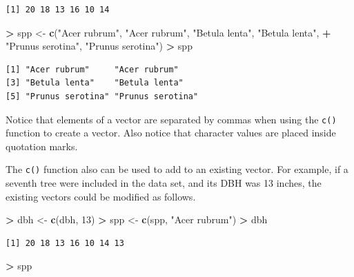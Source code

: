\documentclass[]{krantz}
\makeatletter
\newenvironment{Shaded}{\begin{snugshade}}{\end{snugshade}}
\newcommand{\KeywordTok}[1]{\textcolor[rgb]{0.27,0.27,0.27}{\textbf{#1}}}
\newcommand{\DecValTok}[1]{\textcolor[rgb]{0.06,0.06,0.06}{#1}}
\newcommand{\StringTok}[1]{\textcolor[rgb]{0.5,0.5,0.5}{#1}}
\newcommand{\OperatorTok}[1]{\textcolor[rgb]{0.43,0.43,0.43}{\textbf{#1}}}
\newcommand{\NormalTok}[1]{#1}
\newenvironment{kframe}{%
\medskip{}
\setlength{\fboxsep}{.8em}
 \def\at@end@of@kframe{}%
 \ifinner\ifhmode%
  \def\at@end@of@kframe{\end{minipage}}%
  \begin{minipage}{\columnwidth}%
 \fi\fi%
 \def\FrameCommand##1{\hskip\@totalleftmargin \hskip-\fboxsep
 \colorbox{shadecolor}{##1}\hskip-\fboxsep
     \hskip-\linewidth \hskip-\@totalleftmargin \hskip\columnwidth}%
 \MakeFramed {\advance\hsize-\width
   \@totalleftmargin\z@ \linewidth\hsize
   \@setminipage}}%
 {\par\unskip\endMakeFramed%
 \at@end@of@kframe}
\renewenvironment{Shaded}{\begin{kframe}}{\end{kframe}}
\theoremstyle{definition}
\theoremstyle{definition}
\theoremstyle{definition}
\theoremstyle{remark}
\makeatother
\begin{document}
\begin{verbatim}
[1] 20 18 13 16 10 14
\end{verbatim}

\begin{Shaded}
\begin{Highlighting}[]
\OperatorTok{>}\StringTok{ }\NormalTok{spp <-}\StringTok{ }\KeywordTok{c}\NormalTok{(}\StringTok{"Acer rubrum"}\NormalTok{, }\StringTok{"Acer rubrum"}\NormalTok{, }\StringTok{"Betula lenta"}\NormalTok{, }\StringTok{"Betula lenta"}\NormalTok{, }
\OperatorTok{+}\StringTok{          "Prunus serotina"}\NormalTok{, }\StringTok{"Prunus serotina"}\NormalTok{)}
\OperatorTok{>}\StringTok{ }\NormalTok{spp}
\end{Highlighting}
\end{Shaded}

\begin{verbatim}
[1] "Acer rubrum"     "Acer rubrum"    
[3] "Betula lenta"    "Betula lenta"   
[5] "Prunus serotina" "Prunus serotina"
\end{verbatim}

Notice that elements of a vector are separated by commas when using the
\texttt{c()} function to create a vector. Also notice that character
values are placed inside quotation marks.

The \texttt{c()} function also can be used to add to an existing vector.
For example, if a seventh tree were included in the data set, and its
DBH was 13 inches, the existing vectors could be modified as follows.

\begin{Shaded}
\begin{Highlighting}[]
\OperatorTok{>}\StringTok{ }\NormalTok{dbh <-}\StringTok{ }\KeywordTok{c}\NormalTok{(dbh, }\DecValTok{13}\NormalTok{)}
\OperatorTok{>}\StringTok{ }\NormalTok{spp <-}\StringTok{ }\KeywordTok{c}\NormalTok{(spp, }\StringTok{"Acer rubrum"}\NormalTok{)}
\OperatorTok{>}\StringTok{ }\NormalTok{dbh}
\end{Highlighting}
\end{Shaded}

\begin{verbatim}
[1] 20 18 13 16 10 14 13
\end{verbatim}

\begin{Shaded}
\begin{Highlighting}[]
\OperatorTok{>}\StringTok{ }\NormalTok{spp}
\end{Highlighting}
\end{Shaded}
\end{document}
